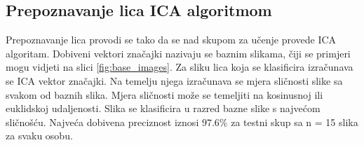 \documentclass[times, utf8, seminar, numeric]{fer}
\begin{document}
\subsection{Prepoznavanje lica ICA algoritmom}

Prepoznavanje lica provodi se tako da se nad skupom za učenje provede ICA algoritam. Dobiveni vektori značajki nazivaju se baznim slikama, čiji se primjeri mogu vidjeti na slici \ref{fig:base_images}. Za sliku lica koja se klasificira izračunava se ICA vektor značajki. Na temelju njega izračunava se mjera sličnosti slike sa svakom od baznih slika. Mjera sličnosti može se temeljiti na kosinusnoj ili euklidskoj udaljenosti. Slika se klasificira u razred bazne slike s najvećom sličnošću. Najveća dobivena preciznost iznosi $97.6\%$ za testni skup sa n = 15 slika za svaku osobu. 
\end{document}
